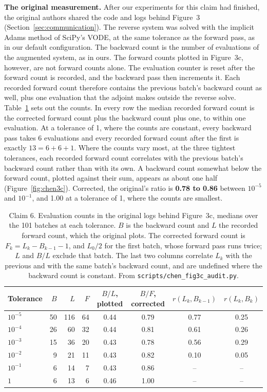 \textbf{The original measurement.} After our experiments for this claim had finished, the
original authors shared the code and logs behind Figure~3 (Section~\ref{sec:communication}). The reverse system was solved with the implicit Adams method of SciPy's VODE, at the same
tolerance as the forward pass, as in our default configuration. The backward count is the number
of evaluations of the augmented system, as in ours. The forward counts plotted in Figure~3c,
however, are not forward counts alone. The evaluation counter is reset after the forward count is
recorded, and the backward pass then increments it. Each recorded forward count therefore
contains the previous batch's backward count as well, plus one evaluation that the adjoint makes
outside the reverse solve. Table~\ref{tab:chen3c} sets out the counts. In every row the median
recorded forward count is the corrected forward count plus the backward count plus one, to
within one evaluation. At a tolerance of 1, where the counts are constant, every backward pass
takes 6 evaluations and every recorded forward count after the first is exactly $13 = 6 + 6 + 1$.
Where the counts vary most, at the three tightest tolerances, each recorded forward count
correlates with the previous batch's backward count rather than with its own. A backward count
somewhat below the forward count, plotted against their sum, appears as about one half
(Figure~\ref{fig:chen3c}). Corrected, the original's ratio is \textbf{0.78 to 0.86} between $10^{-5}$ and $10^{-1}$,
and 1.00 at a tolerance of 1, where the counts are smallest.

\begin{table}[h]
  \centering
  \small
  \caption{Claim 6. Evaluation counts in the original logs behind Figure~3c, medians over the
           101 batches at each tolerance. $B$ is the backward count and $L$ the recorded forward
           count, which the original plots. The corrected forward count is
           $F_k = L_k - B_{k-1} - 1$, and $L_0/2$ for the first batch, whose forward pass runs
           twice; $L$ and $B/L$ exclude that batch. The last two columns correlate $L_k$ with the
           previous and with the same batch's backward count, and are undefined where the
           backward count is constant. From \texttt{scripts/chen\_fig3c\_audit.py}.}
  \label{tab:chen3c}
  \begin{tabular}{@{}lrrrcccc@{}}
    \toprule
    Tolerance & $B$ & $L$ & $F$ & $B/L$, plotted & $B/F$, corrected & $r(L_k, B_{k-1})$ & $r(L_k, B_k)$ \\
    \midrule
    $10^{-5}$ & 50 & 116 & 64 & 0.44 & 0.79 & 0.77 & 0.25 \\
    $10^{-4}$ & 26 &  60 & 32 & 0.44 & 0.81 & 0.61 & 0.26 \\
    $10^{-3}$ & 15 &  36 & 20 & 0.43 & 0.78 & 0.56 & 0.29 \\
    $10^{-2}$ &  9 &  21 & 11 & 0.43 & 0.82 & 0.10 & 0.05 \\
    $10^{-1}$ &  6 &  14 &  7 & 0.43 & 0.86 & --   & --   \\
    $1$       &  6 &  13 &  6 & 0.46 & 1.00 & --   & --   \\
    \bottomrule
  \end{tabular}
\end{table}

